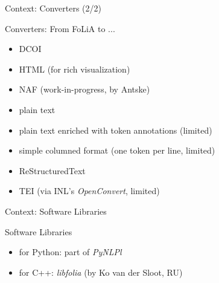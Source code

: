 \documentclass[xcolor=table,10pt,t]{beamer}
\begin{document}
\begin{frame}{Context: Converters (2/2)}
  \begin{block}{Converters: From FoLiA to ...}
      \begin{itemize}
          \item DCOI
          \item HTML (for rich visualization)
          \item NAF (work-in-progress, by Antske)
          \item plain text
          \item plain text enriched with token annotations (limited)
          \item simple columned format (one token per line, limited)
          \item ReStructuredText
          \item TEI (via INL's \emph{OpenConvert}, limited)
      \end{itemize}
  \end{block}
\end{frame}

\begin{frame}{Context: Software Libraries}
    \begin{block}{Software Libraries}
      \begin{itemize}
        \item for Python: part of \emph{PyNLPl}
        \item for C++: \emph{libfolia} (by Ko van der Sloot, RU)
      \end{itemize}
    \end{block}
\end{frame}
\end{document}
